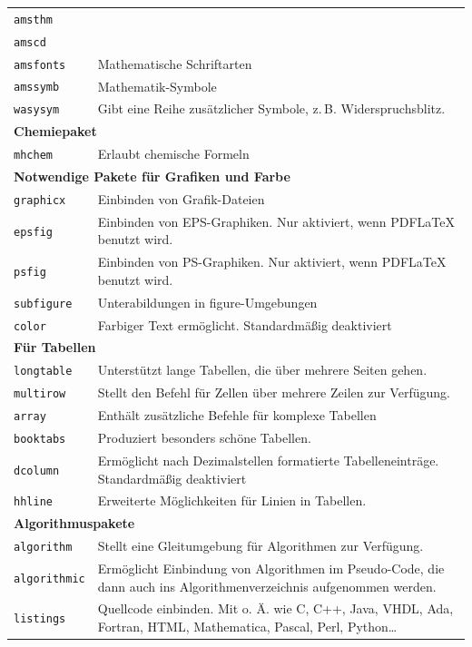 \begin{longtable}{p{}p{}}
\texttt{amsthm}	& \\
\texttt{amscd}	& \\
\texttt{amsfonts}		& Mathematische Schriftarten\\
\texttt{amssymb}		& Mathematik-Symbole\\
\texttt{wasysym}		& Gibt eine Reihe zusätzlicher Symbole, z.\,B.
Widerspruchsblitz.\\
\multicolumn{2}{l}{\bf Chemiepaket}\\
\texttt{mhchem}
				& Erlaubt chemische Formeln\\
\multicolumn{2}{l}{\bf Notwendige Pakete für Grafiken und Farbe}\\
\texttt{graphicx}		& Einbinden von Grafik-Dateien\\
\texttt{epsfig}		& Einbinden von EPS-Graphiken. Nur aktiviert, wenn
PDF\LaTeX{} benutzt wird.\\
\texttt{psfig}		& Einbinden von PS-Graphiken. Nur aktiviert, wenn
PDF\LaTeX{} benutzt wird.\\
\texttt{subfigure}		& Unterabildungen in figure-Umgebungen\\
\texttt{color}		& Farbiger Text ermöglicht. Standardmäßig deaktiviert\\
\multicolumn{2}{l}{\bf Für Tabellen}\\
\texttt{longtable}		& Unterstützt lange Tabellen, die über mehrere Seiten
gehen.\\
\texttt{multirow}		& Stellt den Befehl für Zellen über mehrere Zeilen zur
Verfügung.\\
\texttt{array}		& Enthält zusätzliche Befehle für komplexe Tabellen\\
\texttt{booktabs}		& Produziert besonders schöne Tabellen.\\
\texttt{dcolumn}		& Ermöglicht nach Dezimalstellen formatierte
Tabelleneinträge. Standardmäßig deaktiviert\\
\texttt{hhline}		& Erweiterte Möglichkeiten für Linien in Tabellen.\\
\multicolumn{2}{l}{\bf Algorithmuspakete}\\
\texttt{algorithm}	& Stellt eine Gleitumgebung für Algorithmen zur Verfügung.\\
\texttt{algorithmic}    & Ermöglicht Einbindung von Algorithmen im Pseudo-Code,
die dann auch ins Algorithmenverzeichnis aufgenommen werden.\\
\texttt{listings}		& Quellcode einbinden. Mit \lstset{language=C++} o. Ä. wie
C, C++, Java, VHDL, Ada, Fortran, HTML, Mathematica, Pascal, Perl, Python\dots

\end{longtable}

